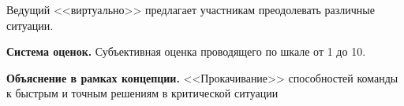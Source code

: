 
\par Ведущий <<виртуально>> предлагает участникам преодолевать различные ситуации.

\par \textbf{Система оценок.} Субъективная оценка проводящего по шкале от 1 до 10.

\par \textbf{Объяснение в рамках концепции.} <<Прокачивание>> способностей команды к быстрым и точным решениям в критической ситуации